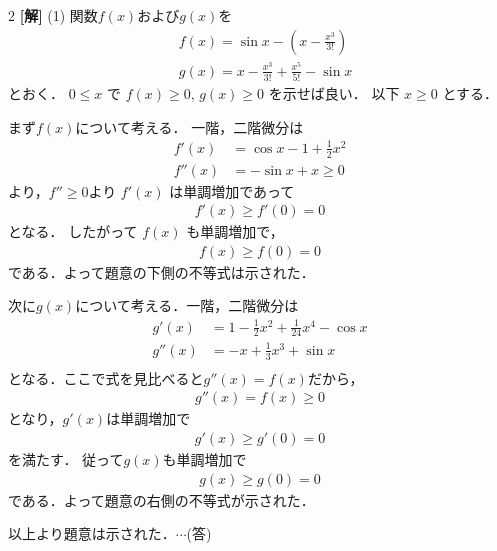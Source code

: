 \documentclass[../../../../main.tex]{subfiles}
\begin{document}
\setcounter{equation}{0}
\begin{oframed}
    
\end{oframed}
\setlength{\columnseprule}{0.4pt}
\begin{multicols}{2}
    {\bf[解]}
    (1)
    関数$f(x)$および$g(x)$を
    \begin{align*}
         & f(x) = \sin x - \left(x - \frac{x^3}{3!}\right)     \\
         & g(x) = x - \frac{x^3}{3!} + \frac{x^5}{5!} - \sin x
    \end{align*}
    とおく．
    $0 \leq x$ で $f(x) \geq 0$, $g(x) \geq 0$ を示せば良い．
    以下 $x \geq 0$ とする．

    まず$f(x)$について考える．
    一階，二階微分は
    \begin{align*}
        f'(x)  & = \cos x - 1 + \frac{1}{2}x^2 \\
        f''(x) & = -\sin x + x \geq 0
    \end{align*}
    より，$f'' \geq 0$より $f'(x)$ は単調増加であって
    \begin{align*}
        f'(x) \geq f'(0) = 0
    \end{align*}
    となる．
    したがって $f(x)$ も単調増加で，
    \begin{align*}
        f(x) \geq f(0) = 0
    \end{align*}
    である．よって題意の下側の不等式は示された．

    次に$g(x)$について考える．一階，二階微分は
    \begin{align*}
        g'(x)  & = 1 - \frac{1}{2}x^2 + \frac{1}{24}x^4 - \cos x \\
        g''(x) & = -x + \frac{1}{3}x^3 + \sin x                  \\
    \end{align*}
    となる．ここで式を見比べると$g''(x)=f(x)$だから，
    \begin{align*}
        g''(x) = f(x) \ge 0
    \end{align*}
    となり，$g'(x)$は単調増加で
    \begin{align*}
        g'(x) \geq g'(0)=0
    \end{align*}
    を満たす．
    従って$g(x)$も単調増加で
    \begin{align*}
        g(x) \geq g(0)=0
    \end{align*}
    である．よって題意の右側の不等式が示された．

    以上より題意は示された．$\cdots$(答)
    \vspace{10pt}


\end{multicols}
\end{document}
